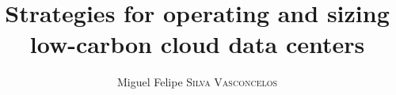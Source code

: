 \documentclass[%
	paper=A4,              %
	twoside=true,          %
	openright,             %
	parskip=half,          %
	chapterprefix=true,    %
	11pt,                  %
	headings=normal,       %
	bibliography=totoc,    %
	listof=totoc,          %
	titlepage=on,          %
	chapterprefix=false,   %
	appendixprefix=false,  %
	draft=false,           %
]{scrreprt}
\title{Strategies for operating and sizing low-carbon cloud data centers}
\author{Miguel Felipe \textsc{Silva Vasconcelos}}
\begin{document}

\pagestyle{empty}  %


\cleardoublepage





\newcommand{\tdmv}[1]{\todo[noinline, backgroundcolor=orange!20, bordercolor=orange, textcolor=purple]{{Miguel: #1}}{}}
\newcommand{\tdfd}[1]{\todo[noinline, backgroundcolor=blue!20, bordercolor=blue, textcolor=blue]{Fanny: #1}}
\newcommand{\tddc}[1]{\todo[noinline,backgroundcolor=teal!20, bordercolor=teal, textcolor=teal]{{Daniel: #1}}{}}




\doublespacing

\setcounter{secnumdepth}{5}

%


%

\cleardoublepage


\pagestyle{plain}  %


\cleardoublepage


\cleardoublepage

\listoffigures
\cleardoublepage

\listoftables
\cleardoublepage

\setcounter{tocdepth}{3}  %
\tableofcontents
\cleardoublepage






\cleardoublepage

\end{document}
